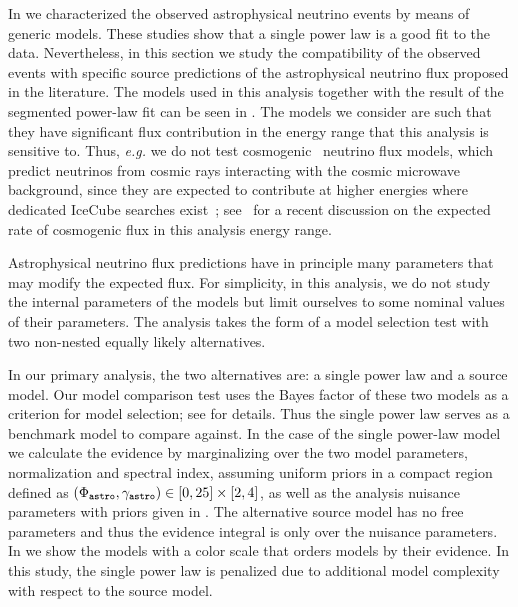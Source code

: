 In  we characterized the observed astrophysical neutrino events by means of generic models.
These studies show that a single power law is a good fit to the data.
Nevertheless, in this section we study the compatibility of the observed events with specific source predictions of the astrophysical neutrino flux proposed in the literature.
The models used in this analysis together with the result of the segmented power-law fit can be seen in .
The models we consider are such that they have significant flux contribution in the energy range that this analysis is sensitive to.
Thus, \textit{e.g.} we do not test cosmogenic~\cite{Halzen:1992cz} neutrino flux models, which predict neutrinos from cosmic rays interacting with the cosmic microwave background, since they are expected to contribute at higher energies where dedicated IceCube searches exist~\cite{Aartsen:2018vtx}; see~\cite{Safa:2019ege} for a recent discussion on the expected rate of cosmogenic flux in this analysis energy range.

Astrophysical neutrino flux predictions have in principle many parameters that may modify the expected flux.
For simplicity, in this analysis, we do not study the internal parameters of the models but limit ourselves to some nominal values of their parameters.
The analysis takes the form of a model selection test with two non-nested equally likely alternatives.

In our primary analysis, the two alternatives are: a single power law and a source model.
Our model comparison test uses the Bayes factor of these two models as a criterion for model selection; see  for details.
Thus the single power law serves as a benchmark model to compare against.
In the case of the single power-law model we calculate the evidence by marginalizing over the two model parameters, normalization and spectral index, assuming uniform priors in a compact region defined as $(\Phi_\texttt{astro},\gamma_\texttt{astro}) \in [0, 25]\times [2,4]$, as well as the analysis nuisance parameters with priors given in .
The alternative source model has no free parameters and thus the evidence integral is only over the nuisance parameters.
In  we show the models with a color scale that orders models by their evidence.
In this study, the single power law is penalized due to additional model complexity with respect to the source model.

